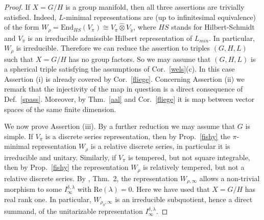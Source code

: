 \documentclass[10]{amsart}
\theoremstyle{remark}
\theoremstyle{definition}
\numberwithin{equation}{section}
\newcommand{\End}{\text{End}}
\begin{document}
{\begin{proof}
If $X=G/H$ is a group manifold, then all three assertions are trivially satisfied. Indeed, $L$-minimal representations are (up to infinitesimal equivalence) of the form $W_\rho=\End_{HS}(V_\pi)\cong V_\pi\hat\otimes V_{\tilde\pi}$, where $HS$ stands for Hilbert-Schmidt and $V_\pi$ is an irreducible admissible Hilbert representation of $L_{min}$. In particular, $W_\rho$ is irreducible.
Therefore we can reduce the assertion to triples $(G,H,L)$ such that $X=G/H$ has no group factors. So we may assume that $(G,H,L)$ is a spherical triple satisfying the assumptions of Cor.~\ref{wels}(c). In this case Assertion (i) is already covered by Cor.~\ref{fliege}. Concerning Assertion (ii) we remark that the injectivity of the map in question
is a direct consequence of Def.~\ref{spass}. Moreover, by Thm.~\ref{aal} and Cor.~\ref{fliege} it is map between vector spaces of the same finite dimension.

We now prove Assertion (iii). By a further reduction we may assume that $G$ is simple. If $V_\pi$ is a discrete series representation, then by Prop.~\ref{fishy} the $\pi$-minimal representation $W_\rho$ is a relative discrete series,
in particular it is irreducible and unitary. Similarly, if $V_\pi$ is tempered, but not square integrable, then by Prop.~\ref{fishy} the representation $W_\rho$ is relatively tempered, but
not a relative discrete series. By \cite{Del85}, Thm.~2, the representation $W_{\rho,\infty}$ allows a non-trivial morphism to some $I^{\delta,\lambda}_\infty$ with $\mathrm {Re}(\lambda)=0$. Here we have used that $X=G/H$ has real rank one. In particular, $W_{\rho_0,\infty}$ is an irreducible subquotient, hence a direct summand, of the unitarizable representation $I^{\delta,\lambda}_\infty$. 


\end{proof}}
\end{document}

